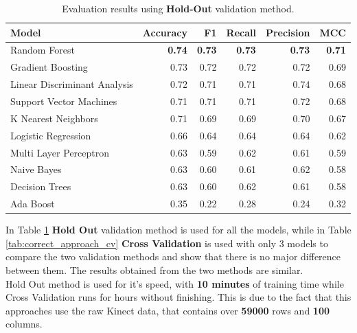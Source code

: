                 \begin{table}[htbp]
                    \centering
                    \begin{tabular}{lrrrrr}
                        \toprule
                        \textbf{Model} & \textbf{Accuracy} & \textbf{F1} & \textbf{Recall} & \textbf{Precision} & \textbf{MCC} \\
                        \midrule
                        Random Forest & \textbf{0.74} & \textbf{0.73} & \textbf{0.73} & \textbf{0.73} & \textbf{0.71} \\
                        Gradient Boosting & 0.73 & 0.72 & 0.72 & 0.72 & 0.69 \\
                        Linear Discriminant Analysis & 0.72 & 0.71 & 0.71 & 0.74 & 0.68 \\
                        Support Vector Machines & 0.71 & 0.71 & 0.71 & 0.72 & 0.68 \\
                        K Nearest Neighbors & 0.71 & 0.69 & 0.69 & 0.70 & 0.67 \\
                        Logistic Regression & 0.66 & 0.64 & 0.64 & 0.64 & 0.62 \\
                        Multi Layer Perceptron & 0.63 & 0.59 & 0.62 & 0.61 & 0.59 \\
                        Naive Bayes & 0.63 & 0.60 & 0.61 & 0.62 & 0.58 \\
                        Decision Trees & 0.63 & 0.60 & 0.62 & 0.61 & 0.58 \\
                        Ada Boost & 0.35 & 0.22 & 0.28 & 0.24 & 0.32 \\
                        \bottomrule
                    \end{tabular}
                    \caption{Evaluation results using \textbf{Hold-Out} validation method.}
                    \label{tab:correct_approach_holdout}
                \end{table}

                In Table \ref{tab:correct_approach_holdout} \textbf{Hold Out} validation method is used for all the models, while in Table \ref{tab:correct_approach_cv} \textbf{Cross Validation} is used with only 3 models to compare the two validation methods and show that there is no major difference between them. The results obtained from the two methods are similar. \\

                Hold Out method is used for it's speed, with \textbf{10 minutes} of training time while Cross Validation runs for hours without finishing. This is due to the fact that this approaches use the raw Kinect data, that contains over \textbf{59000} rows and \textbf{100} columns. 
                
